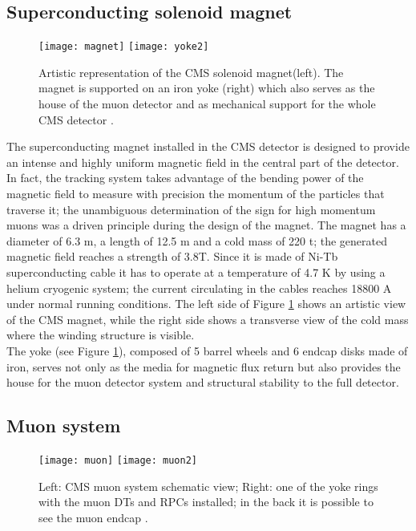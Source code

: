 \subsection{Superconducting solenoid magnet}

\begin{figure}[h!]
  \centering
  \texttt{[image: magnet]}
  \texttt{[image: yoke2]}
  \caption[CMS solenoid magnet]{Artistic representation of the CMS solenoid magnet(left). The magnet is supported on an iron yoke (right) which also serves as the house of the muon detector and as mechanical support for the whole CMS detector \cite{yoke2}.}
  \label{fig:yoke}
\end{figure}

\noindent The superconducting magnet installed in the CMS detector is designed to provide an intense and highly uniform magnetic field in the central part of the detector. In fact, the tracking system takes advantage of the bending power of the magnetic field to measure with precision the momentum of the particles that traverse it; the unambiguous determination of the sign for high momentum muons was a driven principle during the design of the magnet. The magnet has a diameter of 6.3 m, a length of 12.5 m and a cold mass of 220 t; the generated magnetic field reaches a strength of 3.8T. Since it is made of Ni-Tb superconducting cable it has to operate at a temperature of 4.7 K by using a helium cryogenic system; the current circulating in the cables reaches 18800 A under normal running conditions. The left side of Figure \ref{fig:yoke} shows an artistic view of the CMS magnet, while the right side shows a transverse view of the cold mass where the winding structure is visible. \\

\noindent The yoke (see Figure \ref{fig:yoke}), composed of 5 barrel wheels and 6 endcap disks made of iron, serves not only as the media for magnetic flux return but also provides the house for the muon detector system and structural stability to the full detector.     

\subsection{Muon system }

\begin{figure}[h!]
  \centering
  \texttt{[image: muon]}
  \texttt{[image: muon2]}
  \caption[CMS Muon system schematic view]{Left: CMS muon system schematic view; Right: one of the yoke rings with the muon DTs and RPCs installed; in the back it is possible to see the muon endcap \cite{muon}. }
  \label{fig:muon_chambers}
\end{figure}

